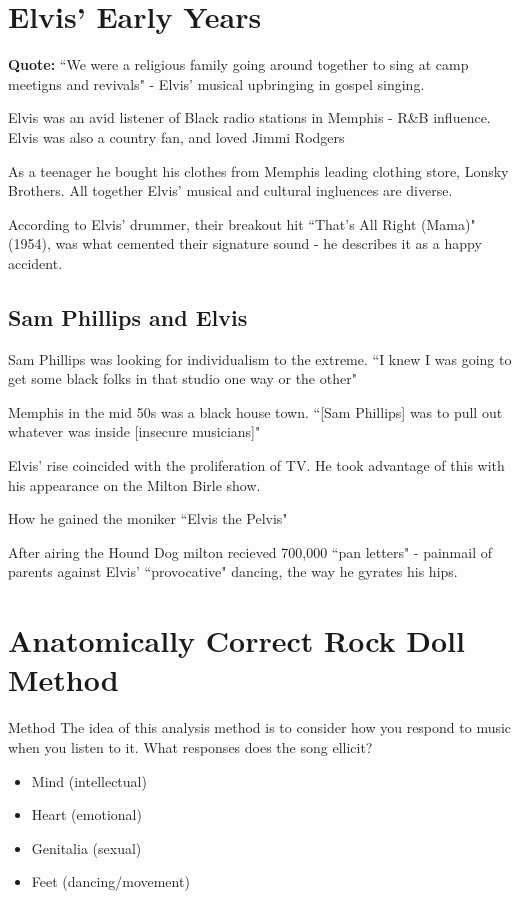 \documentclass[12pt, a4paper, twoside, openright, titlepage]{book}
\begin{document}
\section{Elvis' Early Years}

\textbf{Quote:} ``We were a religious family going around together to sing at camp meetigns and revivals" - Elvis' musical upbringing in gospel singing.


Elvis was an avid listener of Black radio stations in Memphis - R\&B influence. Elvis was also a country fan, and loved Jimmi Rodgers


As a teenager he bought his clothes from Memphis leading clothing store, Lonsky Brothers. All together Elvis' musical and cultural ingluences are diverse.

\begin{rmk}{}{}
    According to Elvis' drummer, their breakout hit ``That's All Right (Mama)" (1954), was what cemented their signature sound - he describes it as a happy accident.
\end{rmk}


\subsection{Sam Phillips and Elvis}

Sam Phillips was looking for individualism to the extreme. ``I knew I was going to get some black folks in that studio one way or the other"

Memphis in the mid 50s was a black house town. ``[Sam Phillips] was to pull out whatever was inside [insecure musicians]"

\begin{rmk}{}{}
    Elvis' rise coincided with the proliferation of TV. He took advantage of this with his appearance on the Milton Birle show.

    How he gained the moniker ``Elvis the Pelvis"
\end{rmk}

After airing the Hound Dog milton recieved 700,000 ``pan letters" - painmail of parents against Elvis' ``provocative" dancing, the way he gyrates his hips.

\section{Anatomically Correct Rock Doll Method}

\begin{defn}{Method}{}
    The idea of this analysis method is to consider how you respond to music when you listen to it. What responses does the song ellicit? \begin{itemize}
        \item Mind (intellectual)
        \item Heart (emotional)
        \item Genitalia (sexual)
        \item Feet (dancing/movement)
    \end{itemize}
\end{defn}
\end{document}
